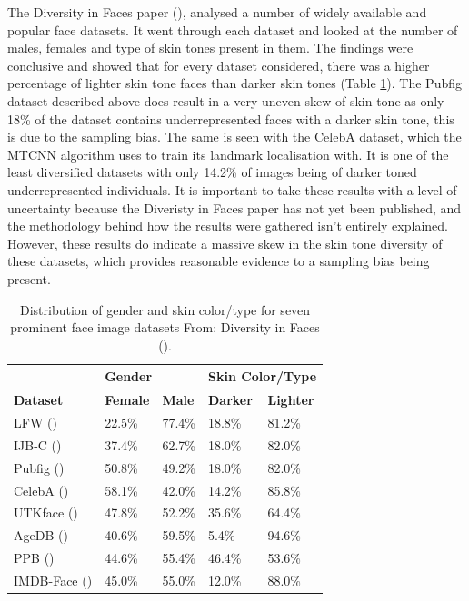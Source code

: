 \documentclass{l4proj}
\begin{document}
The Diversity in Faces paper (\cite{dif}), analysed a number of widely available and popular face datasets. It went through each dataset and looked at the number of males, females and type of skin tones present in them. The findings were conclusive and showed that for every dataset considered, there was a higher percentage of lighter skin tone faces than darker skin tones (Table \ref{diftable}). The Pubfig dataset described above does result in a very uneven skew of skin tone as only 18\% of the dataset contains underrepresented faces with a darker skin tone, this is due to the sampling bias. The same is seen with the CelebA dataset, which the MTCNN algorithm uses to train its landmark localisation with. It is one of the least diversified datasets with only 14.2\% of images being of darker toned underrepresented individuals. It is important to take these results with a level of uncertainty because the Diveristy in Faces paper has not yet been published, and the methodology behind how the results were gathered isn't entirely explained. However, these results do indicate a massive skew in the skin tone diversity of these datasets, which provides reasonable evidence to a sampling bias being present.
\begin{table}[h!]
\centering
\begin{minipage}{\textwidth}
\centering
\begin{tabular}{|l|l|l|l|l|}
\hline
\textbf{} & \multicolumn{2}{l|}{\textbf{Gender}} & \multicolumn{2}{l|}{\textbf{Skin Color/Type}} \\ \hline
\textbf{Dataset} & \textbf{Female} & \textbf{Male} & \textbf{Darker} & \textbf{Lighter} \\ \hline
LFW (\cite{300w}) & 22.5\% & 77.4\% & 18.8\% & 81.2\% \\ \hline
IJB-C (\cite{ijb-c}) & 37.4\% & 62.7\% & 18.0\% & 82.0\% \\ \hline
Pubfig (\cite{pubfig}) & 50.8\% & 49.2\% & 18.0\% & 82.0\% \\ \hline
CelebA (\cite{celeba})& 58.1\% & 42.0\% & 14.2\% & 85.8\% \\ \hline
UTKface (\cite{utkface}) & 47.8\% & 52.2\% & 35.6\% & 64.4\% \\ \hline
AgeDB (\cite{agedb}) & 40.6\% & 59.5\% & 5.4\% & 94.6\% \\ \hline
PPB (\cite{gendershades})& 44.6\% & 55.4\% & 46.4\% & 53.6\% \\ \hline
IMDB-Face (\cite{imdb}) & 45.0\% & 55.0\% & 12.0\% & 88.0\% \\ \hline
\end{tabular}
\vspace*{3mm}
\centering
\caption{Distribution of gender and skin color/type for seven prominent face image datasets From: Diversity in Faces (\cite{dif}). }
\label{diftable}
\end{minipage}
\end{table}
\end{document}

